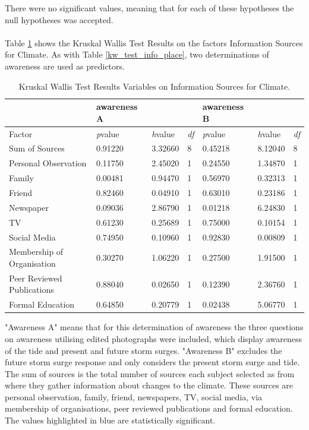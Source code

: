 There were no significant values, meaning that for each of these hypotheses the null hypotheses was accepted.
\paragraph{}
Table \ref{kwtest_info_climate} shows the Kruskal Wallis Test Results on the factors Information Sources for Climate. As with Table \ref{kw_test_info_place}, two determinations of awareness are used as predictors.



\begin{table}[H]
    \centering
    \begin{tabular}{|l|l|l|l|l|l|l|}
    \hline
        & \textbf{awareness A} & ~ & ~ & \textbf{awareness B} & ~ & ~ \\ \hline
        Factor &\textit{p}value &\textit{h}value & \textit{df} & \textit{p}value &\textit{h}value & \textit{df} \\ \hline
        Sum of Sources & 0.91220 & 3.32660 & 8 & 0.45218 & 8.12040 & 8 \\ \hline
        Personal Observation & 0.11750 & 2.45020 & 1 & 0.24550 & 1.34870 & 1 \\ \hline
        Family & \cellcolor[HTML]{7df9ff} 0.00481 & 0.94470 & 1 & 0.56970 & 0.32313 & 1 \\ \hline
        Friend & 0.82460 & 0.04910 & 1 & 0.63010 & 0.23186 & 1 \\ \hline
        Newspaper & 0.09036 & 2.86790 & 1 & \cellcolor[HTML]{7df9ff} 0.01218 & 6.24830 & 1 \\ \hline
        TV & 0.61230 & 0.25689 & 1 & 0.75000 & 0.10154 & 1 \\ \hline
        Social Media & 0.74950 & 0.10960 & 1 & 0.92830 & 0.00809 & 1 \\ \hline
        Membership of Organisation & 0.30270 & 1.06220 & 1 & 0.27500 & 1.91500 & 1 \\ \hline
        Peer Reviewed Publications  & 0.88040 & 0.02650 & 1 & 0.12390 & 2.36760 & 1 \\ \hline
        Formal Education & 0.64850 & 0.20779 & 1 & \cellcolor[HTML]{7df9ff} 0.02438 & 5.06770 & 1 \\ \hline
    \end{tabular}
    \caption{Kruskal Wallis Test Results Variables on Information Sources for Climate.}{ "Awareness A" means that for this determination of awareness the three questions on awareness utilising edited photographs were included, which display awareness of the tide and present and future storm surges.  "Awareness B" excludes the future storm surge response and only considers the present storm surge and tide.  The sum of sources is the total number of sources each subject selected as from where they gather information about changes to the climate. These sources are personal observation, family, friend, newspapers, TV, social media, via membership of organisations, peer reviewed publications and formal education. The values highlighted in blue are statistically significant. }
    \label{kwtest_info_climate}
\end{table}

